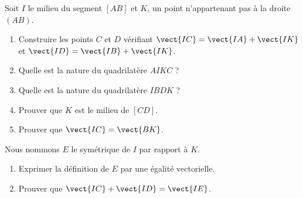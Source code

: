 
\begin{exercice}\label{exosmath-0076}

    Soit \( I\) le milieu du segment \( [AB]\) et \( K\), un point n'appartenant pas à la droite \( (AB)\).
    \begin{enumerate}
        \item
            Construire les points \( C\) et \( D\) vérifiant \( \vect{ IC }=\vect{ IA }+\vect{ IK }\) et \( \vect{ ID }=\vect{ IB }+\vect{ IK }\).
        \item
            Quelle est la nature du quadrilatère \( AIKC\) ? 
        \item
            Quelle est la nature du quadrilatère \( IBDK\) ?
        \item
            Prouver que \( K\) est le milieu de \( [CD]\).
        \item
            Prouver que \( \vect{ IC }=\vect{ BK }\).
    \end{enumerate}
    Nous nommons \( E\) le symétrique de \( I\) par rapport à \( K\).
    \begin{enumerate}
        \item
            Exprimer la définition de \( E\) par une égalité vectorielle.
        \item
            Prouver que \( \vect{ IC }+\vect{ ID }=\vect{ IE }\).
    \end{enumerate}

\end{exercice}
